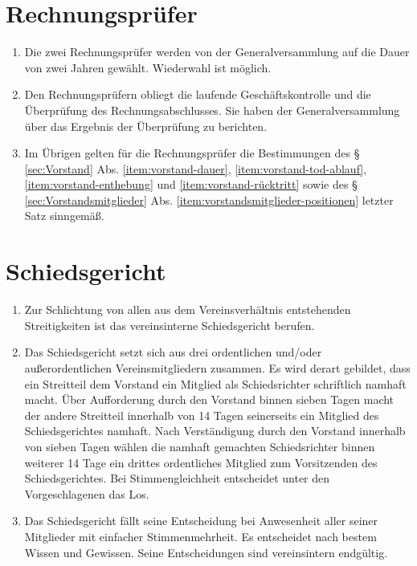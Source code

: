 \documentclass[a4paper,12pt]{article}
\begin{document}
\section{Rechnungsprüfer} %
\label{sec:Rechnungspruefer}
\begin{enumerate}
\item Die zwei Rechnungsprüfer werden von der Generalversammlung auf die Dauer von zwei Jahren gewählt. Wiederwahl ist möglich.
\item Den Rechnungsprüfern obliegt die laufende Geschäftskontrolle und die Überprüfung des Rechnungsabschlusses. Sie haben der Generalversammlung über das Ergebnis der Überprüfung zu berichten.
\item Im Übrigen gelten für die Rechnungsprüfer die Bestimmungen des § \ref{sec:Vorstand} Abs. \ref{item:vorstand-dauer}, \ref{item:vorstand-tod-ablauf}, \ref{item:vorstand-enthebung} und \ref{item:vorstand-rücktritt} sowie des § \ref{sec:Vorstandsmitglieder} Abs. \ref{item:vorstandsmitglieder-positionen} letzter Satz sinngemäß.
\end{enumerate}

\section{Schiedsgericht} %
\label{sec:Schiedsgericht}
\begin{enumerate}
\item Zur Schlichtung von allen aus dem Vereinsverhältnis entstehenden Streitigkeiten ist das vereinsinterne Schiedsgericht berufen.
\item Das Schiedsgericht setzt sich aus drei ordentlichen und/oder außerordentlichen Vereinsmitgliedern zusammen. Es wird derart gebildet, dass ein Streitteil dem Vorstand ein Mitglied als Schiedsrichter schriftlich namhaft macht. Über Aufforderung durch den Vorstand binnen sieben Tagen macht der andere Streitteil innerhalb von 14 Tagen seinerseits ein Mitglied des Schiedsgerichtes namhaft. Nach Verständigung durch den Vorstand innerhalb von sieben Tagen wählen die namhaft gemachten Schiedsrichter binnen weiterer 14 Tage ein drittes ordentliches Mitglied zum Vorsitzenden des Schiedsgerichtes. Bei Stimmengleichheit entscheidet unter den Vorgeschlagenen das Los.
\item Das Schiedsgericht fällt seine Entscheidung bei Anwesenheit aller seiner Mitglieder mit einfacher Stimmenmehrheit. Es entscheidet nach bestem Wissen und Gewissen. Seine Entscheidungen sind vereinsintern endgültig.
\end{enumerate}
\end{document}

